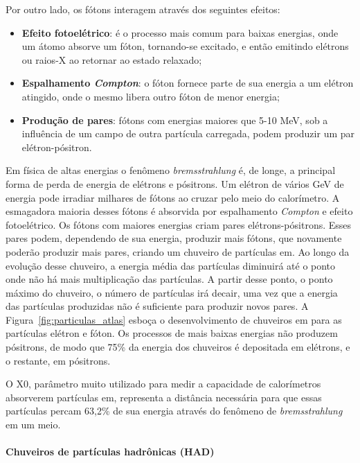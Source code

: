 Por outro lado, os fótons interagem através dos seguintes efeitos:

\begin{itemize}
\item \textbf{Efeito fotoelétrico}: é o processo mais comum para baixas
energias, onde um átomo absorve um fóton, tornando-se excitado, e então emitindo
elétrons ou raios-X ao retornar ao estado relaxado;
\item \textbf{Espalhamento \emph{Compton}}: o fóton fornece parte de sua energia
a um elétron atingido, onde o mesmo libera outro fóton de menor energia;
\item \textbf{Produção de pares}: fótons com energias maiores que 5-10 MeV, 
sob a influência de um campo de outra partícula carregada,
podem produzir um par elétron-pósitron.
\end{itemize}

Em física de altas energias o fenômeno \emph{bremsstrahlung} é, de longe, a
principal forma de perda de energia de elétrons e pósitrons. Um elétron
de vários GeV de energia pode irradiar milhares de fótons ao cruzar pelo meio do
calorímetro. A esmagadora maioria desses fótons é absorvida por espalhamento
\emph{Compton} e efeito fotoelétrico. Os fótons com maiores energias
criam pares elétrons-pósitrons. Esses pares podem, dependendo de sua energia, 
produzir mais fótons, que novamente poderão produzir mais pares,
criando um chuveiro de partículas \gls{em}. Ao longo da evolução desse
chuveiro, a energia média das partículas diminuirá até o ponto onde não há mais
multiplicação das partículas. A partir desse ponto, o ponto máximo do chuveiro,
o número de partículas irá decair, uma vez que a energia das partículas
produzidas não é suficiente para produzir novos pares. A
Figura~\ref{fig:particulas_atlas} esboça o desenvolvimento de chuveiros \gls{em} 
para as partículas elétron e fóton. Os processos de mais
baixas energias não produzem pósitrons, de modo que 75\% da energia dos
chuveiros é depositada em elétrons, e o restante, em pósitrons.


O \gls{X0}, parâmetro muito utilizado para medir a capacidade de calorímetros
absorverem partículas \gls{em}, representa a distância necessária para que 
essas partículas percam 63,2\% de sua energia através do fenômeno de
\emph{bremsstrahlung} em um meio.

\paragraph{Chuveiros de partículas hadrônicas (HAD)}
\label{par:chuveiro_had}

